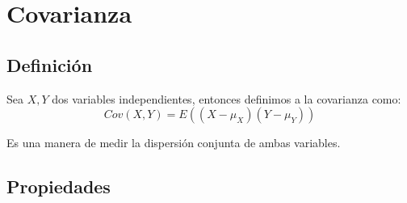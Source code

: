 \documentclass[12pt, fleqn]{report}                             %
\theoremstyle{break}                                            %
\newcommand{\Wrap}[1]{\left( #1 \right)}                        %
\begin{document}
        \clearpage
        \section{Covarianza}

            \subsection{Definición}

                Sea $X, Y$ dos variables independientes, entonces
                definimos a la covarianza como:
                \begin{equation*}
                    Cov(X, Y)
                        = E\Wrap{(X - \mu_{X})(Y - \mu_{Y})}
                \end{equation*}

                Es una manera de medir la dispersión conjunta de ambas variables.



            
            \vspace{1em}
            \subsection{Propiedades}
\end{document}
